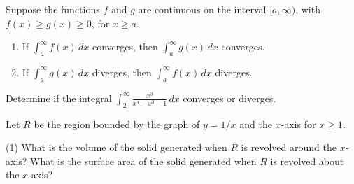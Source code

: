 \documentclass[../mathNotesPreamble]{subfiles}
\begin{document}
    \begin{thmBox*}
      Suppose the functions $f$ and $g$ are continuous on the interval $[a,\infty)$, with\newline $f(x)\geq g(x)\geq 0$, for $x\geq a$.
      \begin{enumerate}
        \item If $\displaystyle \int_a^\infty f(x)\,dx$ converges, then $\int_a^\infty g(x)\,dx$ converges.
        \item If $\displaystyle \int_a^\infty g(x)\,dx$ diverges, then $\int_a^\infty f(x)\,dx$ diverges.
      \end{enumerate}
    \end{thmBox*}

    \begin{ex*}
      Determine if the integral $\displaystyle \int_2^\infty \frac{x^3}{x^4-x^3-1}\,dx$ converges or diverges.
    \end{ex*}
    \pagebreak

  \begin{ex*}
      Let $R$ be the region bounded by the graph of $y=1/x$ and the $x$-axis for $x\geq 1$. 
    \end{ex*}
    \begin{tasks}[after-item-skip=\stretch{1}, label=, item-indent=0pt](1)
      \task What is the volume of the solid generated when $R$ is revolved around the $x$-axis?
      \task What is the surface area of the solid generated when $R$ is revolved about the $x$-axis?
    \end{tasks}
    \pagebreak
\end{document}
